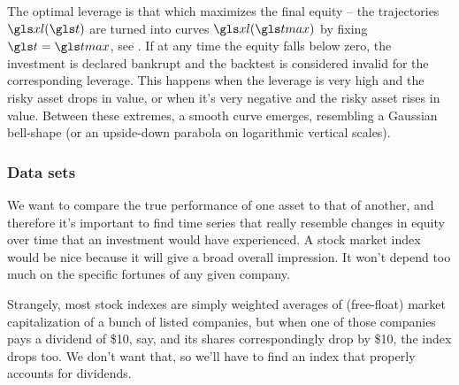 The optimal leverage is that which maximizes the final equity -- the trajectories $\xl(\t)$ are turned into curves $\xl(\tmax)$ by fixing $\t=\tmax$, see . 
If at any time the equity falls below zero, the investment is declared bankrupt and the backtest is considered invalid for the corresponding leverage. This happens when the leverage is very high and the risky asset drops in value, or when it's very negative and the risky asset rises in value. Between these extremes, a smooth curve emerges, resembling a Gaussian bell-shape (or an upside-down parabola on logarithmic vertical scales).

\FloatBarrier 
\subsubsection{Data sets}
We want to compare the true performance of one asset to that of another, and therefore it's important to find time series that really resemble changes in equity over time that an investment would have experienced. A stock market index would be nice because it will give a broad overall impression. It won't depend too much on the specific fortunes of any given company.

Strangely, most stock indexes are simply weighted averages of (free-float) market capitalization of a bunch of listed companies, but when one of those companies pays a dividend of \$10, say, and its shares correspondingly drop by \$10, the index drops too. We don't want that, so we'll have to find an index that properly accounts for dividends. 

